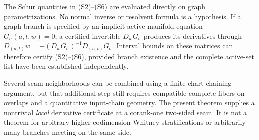 \begin{remark}
The Schur quantities in (S2)--(S6) are evaluated directly on graph
parametrizations.  No normal inverse or resolvent formula is a hypothesis.
If a graph branch is specified by an implicit active-manifold equation
\(G_\sigma(a,t,w)=0\), a certified invertible \(D_wG_\sigma\) produces
its derivatives through
\(D_{(a,t)}w=-(D_wG_\sigma)^{-1}D_{(a,t)}G_\sigma\).
Interval bounds on these matrices can therefore certify (S2)--(S6),
provided branch existence and the complete active-set list have been
established independently.

Several seam neighborhoods can be combined using a finite-chart chaining
argument, but that additional step still requires compatible
complete fibers on overlaps and a quantitative input-chain geometry.
The present theorem supplies a nontrivial \emph{local} derivative
certificate at a corank-one two-sided seam.  It is not a theorem for
arbitrary higher-codimension Whitney stratifications or arbitrarily many
branches meeting on the same side.
\end{remark}

